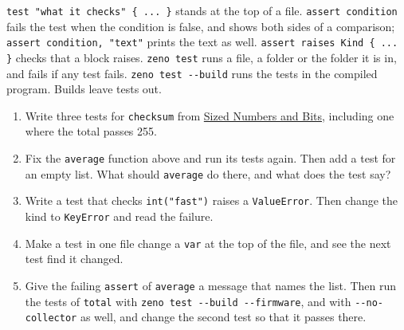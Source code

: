 \begin{summary}
\verb|test "what it checks" { ... }| stands at the top of a file.
\verb|assert condition| fails the test when the condition is false,
and shows both sides of a comparison; \verb|assert condition, "text"|
prints the text as well. \verb|assert raises Kind { ... }| checks that
a block raises. \verb|zeno test| runs a file, a folder or the folder
it is in, and fails if any test fails. \verb|zeno test --build| runs
the tests in the compiled program. Builds leave tests out.
\end{summary}

\begin{tryit}
\begin{enumerate}
\item Write three tests for \verb|checksum| from
  \hyperref[ch-sized-numbers]{Sized Numbers and Bits}, including one
  where the total passes 255.
\item Fix the \verb|average| function above and run its tests again.
  Then add a test for an empty list. What should \verb|average| do
  there, and what does the test say?
\item Write a test that checks \verb|int("fast")| raises a
  \verb|ValueError|. Then change the kind to \verb|KeyError| and read
  the failure.
\item Make a test in one file change a \verb|var| at the top of the
  file, and see the next test find it changed.
\item Give the failing \verb|assert| of \verb|average| a message
  that names the list. Then run the tests of \verb|total| with
  \verb|zeno test --build --firmware|, and with \verb|--no-collector|
  as well, and change the second test so that it passes there.
\end{enumerate}
\end{tryit}

